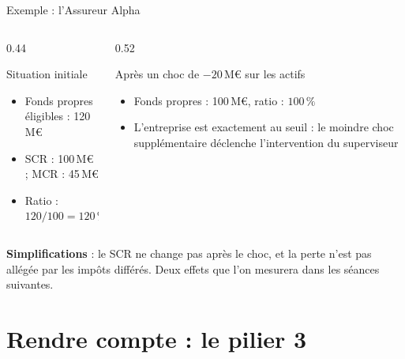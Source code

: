 \documentclass[10pt,aspectratio=169]{beamer}
\begin{document}
\begin{frame}{Exemple : l'Assureur Alpha}
\begin{columns}[T]
\begin{column}{0.44\textwidth}
\begin{block}{Situation initiale}
\begin{itemize}
  \item Fonds propres éligibles : 120\,M\euro
  \item SCR : 100\,M\euro{} ; MCR : 45\,M\euro
  \item Ratio : $120/100 = 120\,\%$
\end{itemize}
\end{block}
\end{column}
\begin{column}{0.52\textwidth}
\begin{alertblock}{Après un choc de $-20$\,M\euro{} sur les actifs}
\begin{itemize}
  \item Fonds propres : 100\,M\euro{}, ratio : $100\,\%$
  \item L'entreprise est exactement au seuil : le moindre choc supplémentaire déclenche
        l'intervention du superviseur
\end{itemize}
\end{alertblock}
\end{column}
\end{columns}
\vspace{0.3cm}
\small \textbf{Simplifications} : le SCR ne change pas après le choc, et la perte n'est pas allégée
par les impôts différés. Deux effets que l'on mesurera dans les séances suivantes.
\end{frame}

\section{Rendre compte : le pilier 3}
\end{document}
